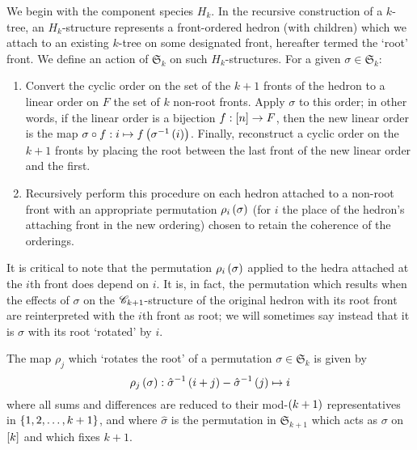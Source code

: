 \documentclass[sectionflow,singlespace,twoside]{brandiss} %
\numberwithin{section}{chapter}
\numberwithin{figure}{chapter}
\begin{document}
We begin with the component species $H_{k}$.
In the recursive construction of a $k$-tree, an $H_{k}$-structure represents a front-ordered hedron (with children) which we attach to an existing $k$-tree on some designated front, hereafter termed the `root' front. We define an action of $\mathfrak{S}_{k}$ on such $H_{k}$-structures.
For a given $\sigma \in \mathfrak{S}_{k}$:
\begin{enumerate}
  \item Convert the cyclic order on the set of the $k+1$ fronts of the hedron to a linear order on $F$ the set of $k$ non-root fronts.
    Apply $\sigma$ to this order; in other words, if the linear order is a bijection $f: \left[ {n} \right] \to F$, then the new linear order is the map $\sigma \circ f: i \mapsto f \left( {\sigma^{-1} \left( {i} \right)} \right)$.
    Finally, reconstruct a cyclic order on the $k+1$ fronts by placing the root between the last front of the new linear order and the first.
  \item Recursively perform this procedure on each hedron attached to a non-root front with an appropriate permutation $\rho_{i} \left( {\sigma} \right)$ (for $i$ the place of the hedron's attaching front in the new ordering) chosen to retain the coherence of the orderings.
\end{enumerate}
It is critical to note that the permutation $\rho_{i} \left( {\sigma} \right)$ applied to the hedra attached at the $i$th front does depend on $i$.
It is, in fact, the permutation which results when the effects of $\sigma$ on the $\mathscr{C}_{k+1}$-structure of the original hedron with its root front are reinterpreted with the $i$th front as root; we will sometimes say instead that it is $\sigma$ with its root `rotated' by $i$.

\begin{theorem}
  The map $\rho_{j}$ which `rotates the root' of a permutation $\sigma \in \mathfrak{S}_{k}$ is given by
  \begin{equation}
    \label{eq:rhodef}
    \rho_{j} \left( {\sigma} \right) : \hat{\sigma}^{-1} \left( {i + j} \right) - \hat{\sigma}^{-1} \left( {j} \right) \mapsto i
  \end{equation}
  where all sums and differences are reduced to their mod-$\left( {k+1} \right)$ representatives in $\left\{ {1, 2, \dots, k+1} \right\}$, and where $\hat{\sigma}$ is the permutation in $\mathfrak{S}_{k+1}$ which acts as $\sigma$ on $\left[ {k} \right]$ and which fixes $k+1$.
\end{theorem}
\end{document}
